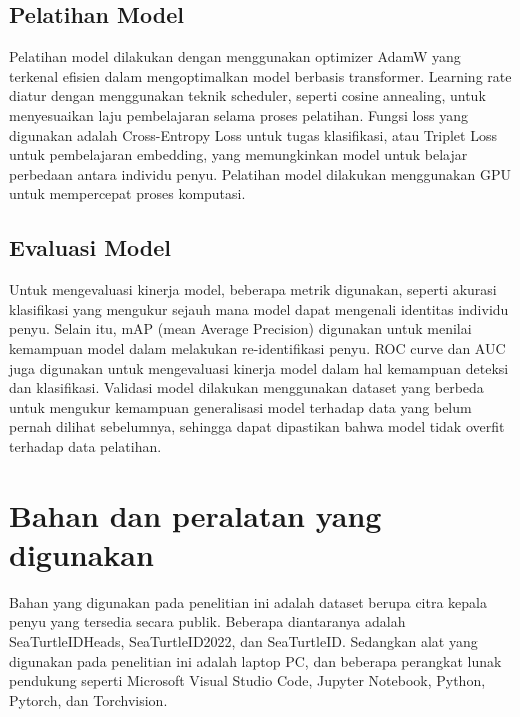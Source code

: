 \subsection{Pelatihan Model}
Pelatihan model dilakukan dengan menggunakan optimizer AdamW yang terkenal efisien dalam mengoptimalkan model berbasis transformer. 
Learning rate diatur dengan menggunakan teknik scheduler, seperti cosine annealing, untuk menyesuaikan laju pembelajaran selama proses pelatihan.
Fungsi loss yang digunakan adalah Cross-Entropy Loss untuk tugas klasifikasi, atau Triplet Loss untuk pembelajaran embedding, yang memungkinkan model untuk belajar perbedaan antara individu penyu.
Pelatihan model dilakukan menggunakan GPU untuk mempercepat proses komputasi.

\subsection{Evaluasi Model}
Untuk mengevaluasi kinerja model, beberapa metrik digunakan, seperti akurasi klasifikasi yang mengukur sejauh mana model dapat mengenali identitas individu penyu. 
Selain itu, mAP (mean Average Precision) digunakan untuk menilai kemampuan model dalam melakukan re-identifikasi penyu. 
ROC curve dan AUC juga digunakan untuk mengevaluasi kinerja model dalam hal kemampuan deteksi dan klasifikasi. 
Validasi model dilakukan menggunakan dataset yang berbeda untuk mengukur kemampuan generalisasi model terhadap data yang belum pernah dilihat sebelumnya, sehingga dapat dipastikan bahwa model tidak overfit terhadap data pelatihan.

\section{Bahan dan peralatan yang digunakan}
Bahan yang digunakan pada penelitian ini adalah dataset berupa citra kepala penyu yang tersedia secara publik.
Beberapa diantaranya adalah SeaTurtleIDHeads, SeaTurtleID2022, dan SeaTurtleID.
Sedangkan alat yang digunakan pada penelitian ini adalah laptop PC, dan beberapa perangkat lunak pendukung seperti Microsoft Visual Studio Code, Jupyter Notebook, Python, Pytorch, dan Torchvision.
